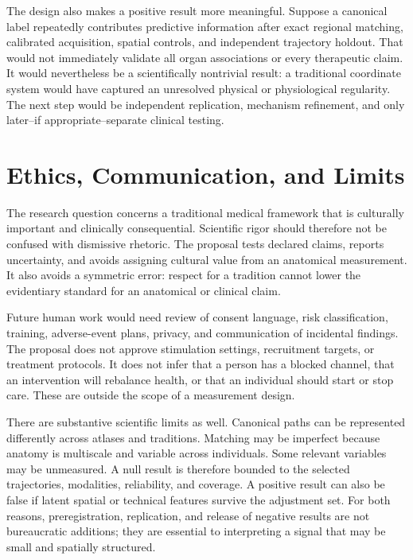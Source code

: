 \documentclass[conference]{IEEEtran}
\begin{document}
The design also makes a positive result more meaningful. Suppose a canonical label repeatedly contributes predictive information after exact regional matching, calibrated acquisition, spatial controls, and independent trajectory holdout. That would not immediately validate all organ associations or every therapeutic claim. It would nevertheless be a scientifically nontrivial result: a traditional coordinate system would have captured an unresolved physical or physiological regularity. The next step would be independent replication, mechanism refinement, and only later--if appropriate--separate clinical testing.

\section{Ethics, Communication, and Limits}

The research question concerns a traditional medical framework that is culturally important and clinically consequential. Scientific rigor should therefore not be confused with dismissive rhetoric. The proposal tests declared claims, reports uncertainty, and avoids assigning cultural value from an anatomical measurement. It also avoids a symmetric error: respect for a tradition cannot lower the evidentiary standard for an anatomical or clinical claim.

Future human work would need review of consent language, risk classification, training, adverse-event plans, privacy, and communication of incidental findings. The proposal does not approve stimulation settings, recruitment targets, or treatment protocols. It does not infer that a person has a blocked channel, that an intervention will rebalance health, or that an individual should start or stop care. These are outside the scope of a measurement design.

There are substantive scientific limits as well. Canonical paths can be represented differently across atlases and traditions. Matching may be imperfect because anatomy is multiscale and variable across individuals. Some relevant variables may be unmeasured. A null result is therefore bounded to the selected trajectories, modalities, reliability, and coverage. A positive result can also be false if latent spatial or technical features survive the adjustment set. For both reasons, preregistration, replication, and release of negative results are not bureaucratic additions; they are essential to interpreting a signal that may be small and spatially structured.
\end{document}
